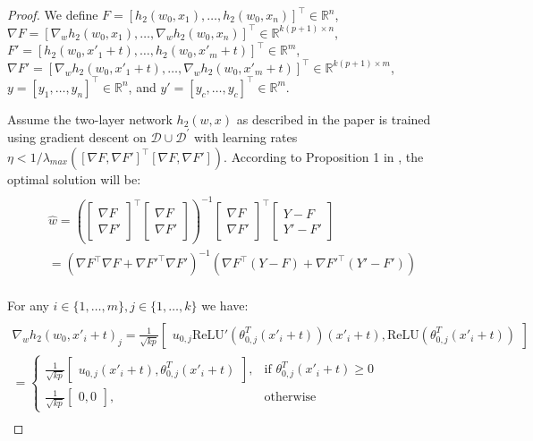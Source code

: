 \begin{proof}
We define $F = [h_2(w_0, x_1), \ldots, h_2(w_0, x_n)]^\top \in \mathbb{R}^n$, $\nabla F = [\nabla_w h_2(w_0, x_1), \ldots, \nabla_w h_2(w_0, x_n)]^\top \in \mathbb{R}^{k(p+1) \times n}$, $F' = [h_2(w_0, x'_1 + t), \ldots, h_2(w_0, x'_m + t)]^\top \in \mathbb{R}^m$, $\nabla F' = [\nabla_w h_2(w_0, x'_1 + t), \ldots, \nabla_w h_2(w_0, x'_m + t)]^\top \in \mathbb{R}^{k(p+1) \times m}$, $y = [y_1, \ldots, y_n]^\top \in \mathbb{R}^n$, and $y' = [y_c, \ldots, y_c]^\top \in \mathbb{R}^m$.

Assume the two-layer network $h_2(w,x)$ as described in the paper is trained using gradient descent on $\mathcal{D} \cup \mathcal{D}^\prime$ with learning rates $\eta < 1 / \lambda_{max}([\nabla F, \nabla F']^\top [\nabla F, \nabla F'])$. According to Proposition 1 in \cite{hastie2020surprises}, the optimal solution will be:
\begin{multline*}
\\
\hat{w} = \left( \begin{bmatrix}\nabla F \\ \nabla F' \end{bmatrix}^\top \begin{bmatrix}\nabla F \\ \nabla F' \end{bmatrix} \right)^{-1} \begin{bmatrix}\nabla F \\ \nabla F' \end{bmatrix}^\top \begin{bmatrix}Y - F \\ Y' - F' \end{bmatrix}
\\
= \left( \nabla F^\top \nabla F + \nabla F'^\top \nabla F' \right)^{-1} \left( \nabla F^\top (Y - F) + \nabla F'^\top (Y' - F') \right)
\\
\end{multline*}

For any $i \in \{1, \dots, m\}, j \in \{1, \dots, k\}$ we have:
\begin{multline*}
\\
\nabla_w h_2(w_0, x'_i + t)_j = \frac{1}{\sqrt{kp}} \begin{bmatrix} u_{0,j} \text{ReLU}'( \theta_{0,j}^T (x'_i + t)) (x'_i + t), \text{ReLU}( \theta_{0,j}^T (x'_i + t)) \end{bmatrix}
\\
= \begin{cases}
    \frac{1}{\sqrt{kp}} \begin{bmatrix} u_{0,j} (x'_i + t), \theta_{0,j}^T (x'_i + t) \end{bmatrix}, & \text{if } \theta_{0,j}^T (x'_i + t) \geq 0\\
    \frac{1}{\sqrt{kp}} \begin{bmatrix} 0, 0 \end{bmatrix}, & \text{otherwise}
\end{cases}
\\
\end{multline*}


\end{proof}
